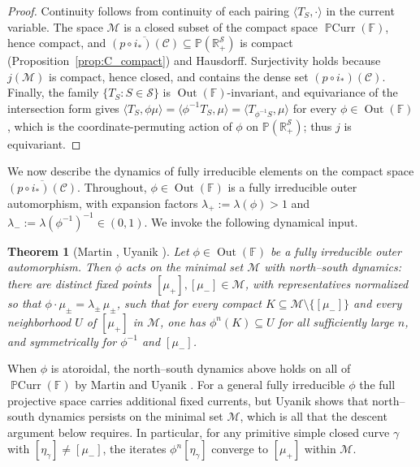 \documentclass[12pt,a4paper]{amsart}
\numberwithin{equation}{section}
\DeclareMathOperator{\Out}{Out}
\newcommand{\FF}{\mathbb{F}}
\theoremstyle{plain}
\newtheorem{theorem}{Theorem}[section]
\theoremstyle{definition}
\theoremstyle{remark}
\begin{document}
\begin{proof}
    Continuity follows from continuity of each pairing $\langle T_S, \cdot\rangle$ in the current variable.
    The space $\mathcal{M}$ is a closed subset of the compact space $\operatorname{\mathbb{P}Curr}(\FF)$, hence compact, and $\overline{(p \circ i_*)(\mathcal{C})} \subseteq \mathbb{P}(\mathbb{R}_+^{\mathcal{S}})$ is compact (Proposition~\ref{prop:C_compact}) and Hausdorff.
    Surjectivity holds because $j(\mathcal{M})$ is compact, hence closed, and contains the dense set $(p \circ i_*)(\mathcal{C})$.
    Finally, the family $\{T_S : S \in \mathcal{S}\}$ is $\Out(\FF)$-invariant, and equivariance of the intersection form gives $\langle T_S, \phi\mu\rangle = \langle \phi^{-1}T_S, \mu\rangle = \langle T_{\phi^{-1}S}, \mu\rangle$ for every $\phi \in \Out(\FF)$, which is the coordinate-permuting action of $\phi$ on $\mathbb{P}(\mathbb{R}_+^{\mathcal{S}})$; thus $j$ is equivariant.
\end{proof}

We now describe the dynamics of fully irreducible elements on the compact space $\overline{(p \circ i_*)(\mathcal{C})}$.
Throughout, $\phi \in \Out(\FF)$ is a fully irreducible outer automorphism, with expansion factors $\lambda_+ := \lambda(\phi) > 1$ and $\lambda_- := \lambda(\phi^{-1})^{-1} \in (0,1)$.
We invoke the following dynamical input.

\begin{theorem}[Martin \cite{MR2693216}, Uyanik \cite{MR3273532, MR3370027}]\label{thm:NS-currents}
    Let $\phi \in \Out(\FF)$ be a fully irreducible outer automorphism.
    Then $\phi$ acts on the minimal set $\mathcal{M}$ with north–south dynamics: there are distinct fixed points $[\mu_+], [\mu_-] \in \mathcal{M}$, with representatives normalized so that $\phi \cdot \mu_\pm = \lambda_\pm\, \mu_\pm$, such that for every compact $K \subseteq \mathcal{M} \setminus \{[\mu_-]\}$ and every neighborhood $U$ of $[\mu_+]$ in $\mathcal{M}$, one has $\phi^n(K) \subseteq U$ for all sufficiently large $n$, and symmetrically for $\phi^{-1}$ and $[\mu_-]$.
\end{theorem}

When $\phi$ is atoroidal, the north–south dynamics above holds on all of $\operatorname{\mathbb{P}Curr}(\FF)$ by Martin \cite{MR2693216} and Uyanik \cite{MR3273532}.
For a general fully irreducible $\phi$ the full projective space carries additional fixed currents, but Uyanik \cite{MR3370027} shows that north–south dynamics persists on the minimal set $\mathcal{M}$, which is all that the descent argument below requires.
In particular, for any primitive simple closed curve $\gamma$ with $[\eta_\gamma] \neq [\mu_-]$, the iterates $\phi^n[\eta_\gamma]$ converge to $[\mu_+]$ within $\mathcal{M}$.
\end{document}
